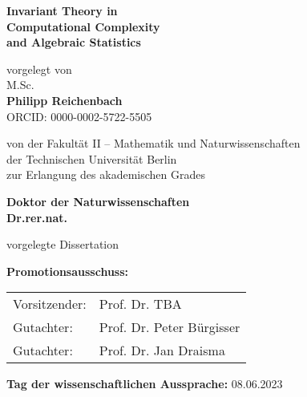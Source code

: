 \documentclass[12pt,a4paper]{book}
\theoremstyle{theorem}
\theoremstyle{definition}
\theoremstyle{remark}
\begin{document}
\frontmatter



\thispagestyle{empty}


\begin{center}
	{\Huge \textbf{Invariant Theory in
			\\ \vspace{5pt}
			Computational Complexity
			\\ \vspace{15pt}
			and Algebraic Statistics}}
	
	\vspace{2cm}
	
	
	{\sffamily \large
	vorgelegt von\\
	M.\hspace{4pt}Sc.\\
	\vspace{5pt}
	\textbf{\Large Philipp Reichenbach}\\
	\vspace{7pt}
	ORCID: 0000-0002-5722-5505}
	
	\vspace{1.7cm}
	
	{\large
	von der Fakultät II -- Mathematik und Naturwissenschaften\\ \vspace{3pt}
	der Technischen Universität Berlin\\ \vspace{5pt}
	zur Erlangung des akademischen Grades}
	
	\vspace{0.6cm}
	
	\textbf{\Large \sffamily Doktor der Naturwissenschaften\\
	\vspace{7pt}
	Dr.\hspace{4pt}rer.\hspace{4pt}nat.}
	
	\vspace{0.7cm}
	
	{\large vorgelegte Dissertation}
\end{center}

\vspace{1.7cm}

{\large
\textbf{Promotionsausschuss:}

\vspace{0.5cm}

\begin{tabular}{ll}
	Vorsitzender: & Prof. Dr. TBA \\
	Gutachter: & Prof. Dr. Peter Bürgisser  \\
	Gutachter: & Prof. Dr. Jan Draisma \\
\end{tabular}

\vspace{0.5cm}

\textbf{Tag der wissenschaftlichen Aussprache:} 08.06.2023}
\end{document}
